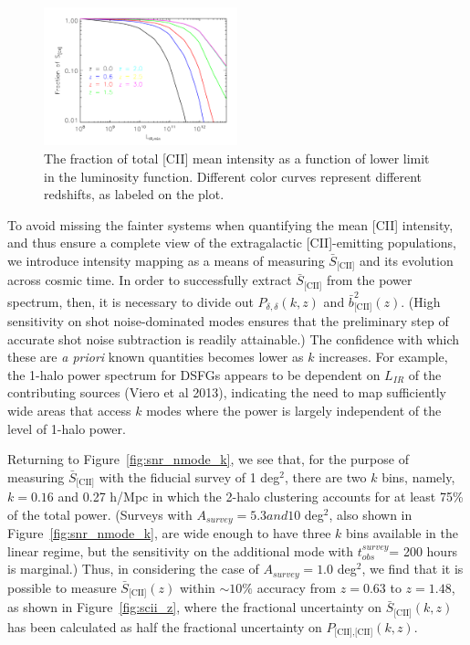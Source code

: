 \documentclass[12pt,preprint]{emulateapj}
\begin{document}
\begin{figure}
\centering
\includegraphics[width=0.5\textwidth]{fraction_cii_emissivity_vs_LIRmin_vs_z}
\caption{The fraction of total [CII] mean intensity as a function of lower limit in the luminosity function. Different color curves represent different redshifts, as labeled on the plot.}
\label{fig:frac_cii_b11_lirmin}
\end{figure}

To avoid missing the fainter systems when quantifying the mean [CII] intensity, and thus ensure a complete view of the extragalactic [CII]-emitting populations, we introduce intensity mapping as a means of measuring $\bar{S}_{\textrm{[CII]}}$ and its evolution across cosmic time. In order to successfully extract $\bar{S}_{\textrm{[CII]}}$ from the power spectrum, then, it is necessary to divide out $P_{\delta,\delta}(k,z)$ and $\bar{b}_{\textrm{[CII]}}^2(z)$. (High sensitivity on shot noise-dominated modes ensures that the preliminary step of accurate shot noise subtraction is readily attainable.) The confidence with which these are \emph{a priori} known quantities becomes lower as $k$ increases. For example, the 1-halo power spectrum for DSFGs appears to be dependent on $L_{IR}$ of the contributing sources (Viero et al 2013), indicating the need to map sufficiently wide areas that access $k$ modes where the power is largely independent of the level of 1-halo power. 

Returning to Figure~\ref{fig:snr_nmode_k}, we see that, for the purpose of measuring $\bar{S}_{\textrm{[CII]}}$ with the fiducial survey of 1 deg$^2$, there are two $k$ bins, namely, $k = 0.16$ and 0.27 h/Mpc in which the 2-halo clustering accounts for at least 75\% of the total power. (Surveys with $A_{survey} = 5.3 and 10$ deg$^2$, also shown in Figure~\ref{fig:snr_nmode_k}, are wide enough to have three $k$ bins available in the linear regime, but the sensitivity on the additional mode with $t_{obs}^{survey}$= 200 hours is marginal.) Thus, in considering the case of $A_{survey} = 1.0$ deg$^2$, we find that it is possible to measure $\bar{S}_{\textrm{[CII]}}(z)$ within $\sim10\%$ accuracy from $z = 0.63$ to $z=1.48$, as shown in Figure~\ref{fig:scii_z}, where the fractional uncertainty on $\bar{S}_{\textrm{[CII]}}(k,z)$ has been calculated as half the fractional uncertainty on $P_{\textrm{[CII],[CII]}}(k,z)$.
\end{document}
